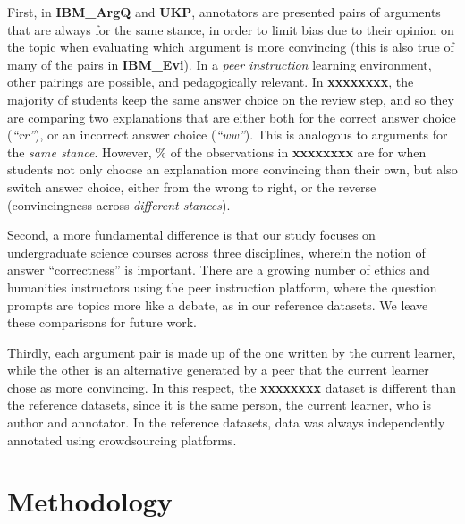 \documentclass[runningheads]{llncs}
\begin{document}
First, in \textbf{IBM\_ArgQ} and \textbf{UKP}, annotators are presented pairs 
of arguments that are always for the same stance, in order to limit bias due to 
their opinion on the topic when evaluating which argument is more convincing 
(this is also true of many of the pairs in \textbf{IBM\_Evi}).
In a \textit{peer instruction} learning environment, other pairings are 
possible, and pedagogically relevant. 
In \textbf{xxxxxxxx}, the majority of students keep the same answer choice 
on the review step, and so they are comparing two explanations that 
are either both for the correct answer choice (\textit{``rr''}), or an 
incorrect answer choice (\textit{``ww''}).
This is analogous to arguments for the \textit{same stance}. 
However, \% of the 
observations in \textbf{xxxxxxxx} are for when students not only choose an 
explanation more convincing than their own, but also switch answer choice, 
either from the wrong to right, or the reverse (convincingness across 
\textit{different stances}).
 
Second, a more fundamental difference is that our study focuses on 
undergraduate science courses across three disciplines, wherein the notion of 
answer ``correctness'' is important.
There are a growing number of ethics and humanities instructors using the peer 
instruction platform, where the question prompts are topics more like a debate, 
as in our reference datasets. 
We leave these comparisons for future work.

Thirdly, each argument pair is made up of the one written by the current 
learner, while the other is an alternative generated by a peer that the current 
learner chose as more convincing. 
In this respect, the \textbf{xxxxxxxx} dataset is different than the 
reference datasets, since it is the same person, the current learner, who is 
author and annotator. In the reference datasets, data was always independently 
annotated using crowdsourcing platforms.


\section{Methodology}
\end{document}
